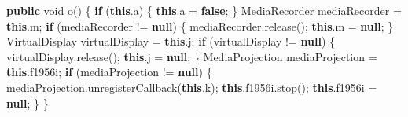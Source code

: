 \documentclass[
]{article}
\newenvironment{Shaded}{}{}
\newcommand{\ControlFlowTok}[1]{\textcolor[rgb]{0.00,0.44,0.13}{\textbf{#1}}}
\newcommand{\DataTypeTok}[1]{\textcolor[rgb]{0.56,0.13,0.00}{#1}}
\newcommand{\FunctionTok}[1]{\textcolor[rgb]{0.02,0.16,0.49}{#1}}
\newcommand{\KeywordTok}[1]{\textcolor[rgb]{0.00,0.44,0.13}{\textbf{#1}}}
\newcommand{\NormalTok}[1]{#1}
\newcommand{\OperatorTok}[1]{\textcolor[rgb]{0.40,0.40,0.40}{#1}}
\begin{document}
\begin{Shaded}
\begin{Highlighting}[]
    \KeywordTok{public} \DataTypeTok{void} \FunctionTok{o}\OperatorTok{()} \OperatorTok{\{}
        \ControlFlowTok{if} \OperatorTok{(}\KeywordTok{this}\OperatorTok{.}\FunctionTok{a}\OperatorTok{)} \OperatorTok{\{}
            \KeywordTok{this}\OperatorTok{.}\FunctionTok{a} \OperatorTok{=} \KeywordTok{false}\OperatorTok{;}
        \OperatorTok{\}}
\NormalTok{        MediaRecorder mediaRecorder }\OperatorTok{=} \KeywordTok{this}\OperatorTok{.}\FunctionTok{m}\OperatorTok{;}
        \ControlFlowTok{if} \OperatorTok{(}\NormalTok{mediaRecorder }\OperatorTok{!=} \KeywordTok{null}\OperatorTok{)} \OperatorTok{\{}
\NormalTok{            mediaRecorder}\OperatorTok{.}\FunctionTok{release}\OperatorTok{();}
            \KeywordTok{this}\OperatorTok{.}\FunctionTok{m} \OperatorTok{=} \KeywordTok{null}\OperatorTok{;}
        \OperatorTok{\}}
\NormalTok{        VirtualDisplay virtualDisplay }\OperatorTok{=} \KeywordTok{this}\OperatorTok{.}\FunctionTok{j}\OperatorTok{;}
        \ControlFlowTok{if} \OperatorTok{(}\NormalTok{virtualDisplay }\OperatorTok{!=} \KeywordTok{null}\OperatorTok{)} \OperatorTok{\{}
\NormalTok{            virtualDisplay}\OperatorTok{.}\FunctionTok{release}\OperatorTok{();}
            \KeywordTok{this}\OperatorTok{.}\FunctionTok{j} \OperatorTok{=} \KeywordTok{null}\OperatorTok{;}
        \OperatorTok{\}}
\NormalTok{        MediaProjection mediaProjection }\OperatorTok{=} \KeywordTok{this}\OperatorTok{.}\FunctionTok{f1956i}\OperatorTok{;}
        \ControlFlowTok{if} \OperatorTok{(}\NormalTok{mediaProjection }\OperatorTok{!=} \KeywordTok{null}\OperatorTok{)} \OperatorTok{\{}
\NormalTok{            mediaProjection}\OperatorTok{.}\FunctionTok{unregisterCallback}\OperatorTok{(}\KeywordTok{this}\OperatorTok{.}\FunctionTok{k}\OperatorTok{);}
            \KeywordTok{this}\OperatorTok{.}\FunctionTok{f1956i}\OperatorTok{.}\FunctionTok{stop}\OperatorTok{();}
            \KeywordTok{this}\OperatorTok{.}\FunctionTok{f1956i} \OperatorTok{=} \KeywordTok{null}\OperatorTok{;}
        \OperatorTok{\}}
    \OperatorTok{\}}


\end{Highlighting}
\end{Shaded}
\end{document}
